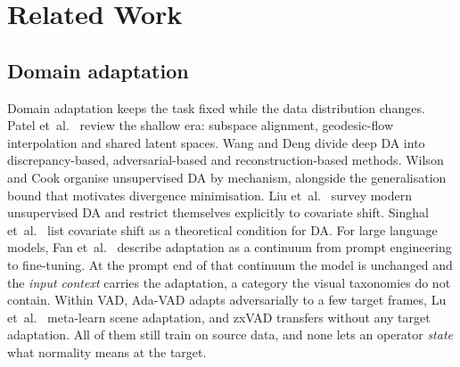 \documentclass[conference,a4paper]{IEEEtran}
\begin{document}
\section{Related Work}
\label{sec:related}

\subsection{Domain adaptation}
Domain adaptation keeps the task fixed while the data distribution changes.
Patel et~al.\ \cite{patel2015visual} review the shallow era: subspace
alignment, geodesic-flow interpolation and shared latent spaces. Wang and
Deng \cite{wang2018deep} divide deep DA into discrepancy-based,
adversarial-based and reconstruction-based methods. Wilson and Cook
\cite{wilson2020survey} organise unsupervised DA by mechanism, alongside the
generalisation bound that motivates divergence minimisation. Liu
et~al.\ \cite{liu2022deep} survey modern unsupervised DA and restrict
themselves explicitly to covariate shift. Singhal et~al.\ \cite{singhal2023domain}
list covariate shift as a theoretical condition for DA. For large language
models, Fan et~al.\ \cite{fan2026llm} describe adaptation as a continuum from
prompt engineering to fine-tuning. At the prompt end of that continuum the model
is unchanged and the \emph{input context} carries the adaptation, a category the
visual taxonomies do not contain. Within VAD, Ada-VAD \cite{adavad2024} adapts
adversarially to a few target frames, Lu et~al.\ \cite{lu2020fewshot}
meta-learn scene adaptation, and zxVAD \cite{aich2023zxvad} transfers without
any target adaptation. All of them still train on source data, and none lets an
operator \emph{state} what normality means at the target.
\end{document}
